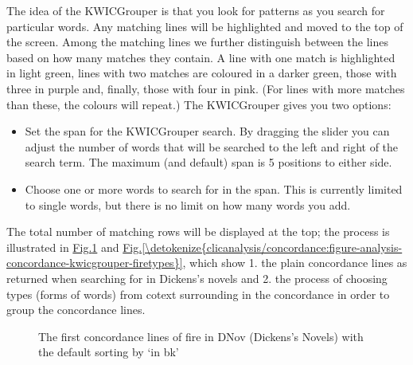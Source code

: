 \documentclass[letterpaper,10pt,english]{sphinxmanual}
\begin{document}
\sphinxAtStartPar
The idea of the KWICGrouper is that you look for patterns as you search
for particular words. Any matching lines will be highlighted and moved
to the top of the screen. Among the matching lines we further
distinguish between the lines based on how many matches they contain. A
line with one match is highlighted in light green, lines with two
matches are coloured in a darker green, those with three in purple and,
finally, those with four in pink. (For lines with more matches than
these, the colours will repeat.) The KWICGrouper gives you two options:
\begin{itemize}
\item {} 
\sphinxAtStartPar
{} Set the span for the KWICGrouper search. By
dragging the slider you can adjust the number of words that will be
searched to the left and right of the search term. The maximum (and
default) span is 5 positions to either side.

\item {} 
\sphinxAtStartPar
{} Choose one or more words to search for in the
span. This is currently limited to single words, but there is no
limit on how many words you add.

\end{itemize}

\sphinxAtStartPar
The total number of matching rows will be displayed at the top; the
process is illustrated in \hyperref[\detokenize{clicanalysis/concordance:figure-analysis-concordance-kwicgrouper-fireplain}]{Fig.\@ \ref{\detokenize{clicanalysis/concordance:figure-analysis-concordance-kwicgrouper-fireplain}}}
and \hyperref[\detokenize{clicanalysis/concordance:figure-analysis-concordance-kwicgrouper-firetypes}]{Fig.\@ \ref{\detokenize{clicanalysis/concordance:figure-analysis-concordance-kwicgrouper-firetypes}}}, which
show 1. the plain concordance lines as returned when searching for
 in Dickens’s novels and 2. the process of choosing types (forms
of words) from co\sphinxhyphen{}text surrounding  in the concordance in order
to group the concordance lines.

\begin{figure}[htbp]
\centering
\capstart

\noindent{}
\caption{The first concordance lines of fire in DNov (Dickens’s
Novels) with the default sorting by ‘in bk’}\label{\detokenize{clicanalysis/concordance:id15}}\label{\detokenize{clicanalysis/concordance:figure-analysis-concordance-kwicgrouper-fireplain}}\end{figure}
\end{document}
